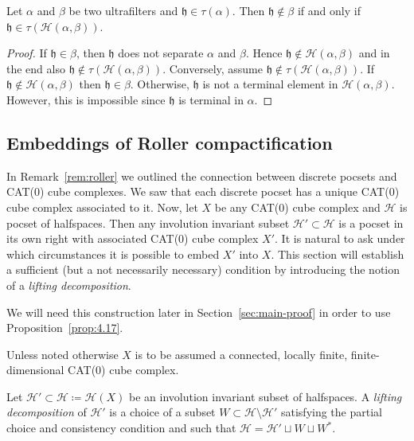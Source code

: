 \begin{lemma}[{\cite[Lemma~4.12]{MR3509968}}]
  \label{lem:4.12}
  Let \(\alpha\) and \(\beta\) be two ultrafilters and \(\mathfrak{h} \in \tau(\alpha)\). Then \(\mathfrak{h} \notin \beta\) if and only if \(\mathfrak{h} \in \tau(\mathcal{H}(\alpha,\beta))\).
\end{lemma}

\begin{proof}
  If \(\mathfrak{h} \in \beta\), then \(\mathfrak{h}\) does not separate \(\alpha\) and \(\beta\). Hence \(\mathfrak{h} \notin \mathcal{H}(\alpha, \beta)\) and in the end also \(\mathfrak{h} \notin \tau(\mathcal{H}(\alpha, \beta))\). Conversely, assume \(\mathfrak{h} \notin \tau(\mathcal{H}(\alpha, \beta))\). If \(\mathfrak{h} \notin \mathcal{H}(\alpha, \beta)\) then \(\mathfrak{h} \in \beta\). Otherwise, \(\mathfrak{h}\) is not a terminal element in \(\mathcal{H}(\alpha, \beta)\). However, this is impossible since \(\mathfrak{h}\) is terminal in \(\alpha\).
\end{proof}

\subsection{Embeddings of Roller compactification}
\label{sec:embedding-roller}
In Remark~\ref{rem:roller} we outlined the connection between discrete pocsets and CAT(0) cube complexes. We saw that each discrete pocset has a unique CAT(0) cube complex associated to it. Now, let \(X\) be any CAT(0) cube complex and \(\mathcal{H}\) is pocset of halfspaces. Then any involution invariant subset \(\mathcal{H}' \subset \mathcal{H}\) is a pocset in its own right with associated CAT(0) cube complex \(X'\). It is natural to ask under which circumstances it is possible to embed \(X'\) into \(X\). This section will establish a sufficient (but a not necessarily necessary) condition by introducing the notion of a \emph{lifting decomposition}.

We will need this construction later in Section~\ref{sec:main-proof} in order to use Proposition~\ref{prop:4.17}.

Unless noted otherwise \(X\) is to be assumed a connected, locally finite, finite-dimensional CAT(0) cube complex.

\begin{defin}
  Let \(\mathcal{H}' \subset \mathcal{H} \coloneqq \mathcal{H}(X)\) be an involution invariant subset of halfspaces. A \emph{lifting decomposition} of \(\mathcal{H}'\) is a choice of a subset \(W \subset \mathcal{H} \setminus \mathcal{H}'\) satisfying the partial choice and consistency condition and such that \(\mathcal{H} = \mathcal{H}' \sqcup W \sqcup W^\ast\).
\end{defin}

